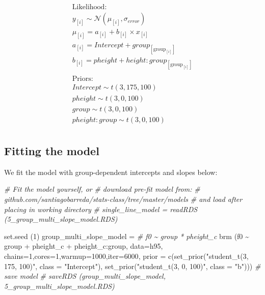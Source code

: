 \documentclass[
]{book}
\newenvironment{Shaded}{\begin{snugshade}}{\end{snugshade}}
\newcommand{\AttributeTok}[1]{\textcolor[rgb]{0.77,0.63,0.00}{#1}}
\newcommand{\CommentTok}[1]{\textcolor[rgb]{0.56,0.35,0.01}{\textit{#1}}}
\newcommand{\DecValTok}[1]{\textcolor[rgb]{0.00,0.00,0.81}{#1}}
\newcommand{\FunctionTok}[1]{\textcolor[rgb]{0.00,0.00,0.00}{#1}}
\newcommand{\NormalTok}[1]{#1}
\newcommand{\OtherTok}[1]{\textcolor[rgb]{0.56,0.35,0.01}{#1}}
\newcommand{\SpecialCharTok}[1]{\textcolor[rgb]{0.00,0.00,0.00}{#1}}
\newcommand{\StringTok}[1]{\textcolor[rgb]{0.31,0.60,0.02}{#1}}
\begin{document}
\begin{equation}
\begin{split}
\textrm{Likelihood:} \\
y_{[i]} \sim \mathcal{N}(\mu_{[i]},\sigma_{error}) \\
\mu_{[i]} = a_{[i]} + b_{[i]} \times x_{[i]}  \\ 
a_{[i]} = Intercept + group_{[\mathrm{group}_{[i]}]} \\
b_{[i]} = pheight + height \colon group_{[\mathrm{group}_{[i]}]} \\ \\
\textrm{Priors:} \\
Intercept \sim t(3, 175, 100) \\
pheight \sim t(3, 0, 100) \\ 
group \sim t(3, 0, 100) \\ 
pheight \colon group \sim t(3, 0, 100) \\ 
\end{split}
\label{eq:516}
\end{equation}

\hypertarget{fitting-the-model-5}{%
\subsection{Fitting the model}\label{fitting-the-model-5}}

We fit the model with group-dependent intercepts and slopes below:

\begin{Shaded}
\begin{Highlighting}[]
\CommentTok{\# Fit the model yourself, or}
\CommentTok{\# download pre{-}fit model from: }
\CommentTok{\# github.com/santiagobarreda/stats{-}class/tree/master/models}
\CommentTok{\# and load after placing in working directory}
\CommentTok{\# single\_line\_model = readRDS (\textquotesingle{}5\_group\_multi\_slope\_model.RDS\textquotesingle{})}

\FunctionTok{set.seed}\NormalTok{ (}\DecValTok{1}\NormalTok{)}
\NormalTok{group\_multi\_slope\_model }\OtherTok{=}
  \CommentTok{\#   f0 \textasciitilde{} group * pheight\_c}
  \FunctionTok{brm}\NormalTok{ (f0 }\SpecialCharTok{\textasciitilde{}}\NormalTok{ group }\SpecialCharTok{+}\NormalTok{ pheight\_c }\SpecialCharTok{+}\NormalTok{ pheight\_c}\SpecialCharTok{:}\NormalTok{group, }
       \AttributeTok{data=}\NormalTok{h95, }\AttributeTok{chains=}\DecValTok{1}\NormalTok{,}\AttributeTok{cores=}\DecValTok{1}\NormalTok{,}\AttributeTok{warmup=}\DecValTok{1000}\NormalTok{,}\AttributeTok{iter=}\DecValTok{6000}\NormalTok{,}
       \AttributeTok{prior =} \FunctionTok{c}\NormalTok{(}\FunctionTok{set\_prior}\NormalTok{(}\StringTok{"student\_t(3, 175, 100)"}\NormalTok{, }\AttributeTok{class =} \StringTok{"Intercept"}\NormalTok{),}
                 \FunctionTok{set\_prior}\NormalTok{(}\StringTok{"student\_t(3, 0, 100)"}\NormalTok{, }\AttributeTok{class =} \StringTok{"b"}\NormalTok{)))}
\CommentTok{\# save model}
\CommentTok{\# saveRDS (group\_multi\_slope\_model, \textquotesingle{}5\_group\_multi\_slope\_model.RDS\textquotesingle{})}
\end{Highlighting}
\end{Shaded}
\end{document}

